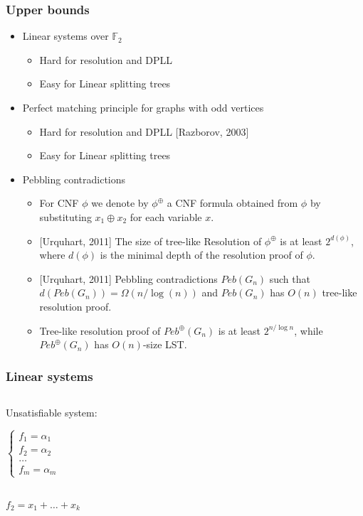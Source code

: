 \begin{frame}
    \frametitle{Upper bounds}

    \begin{itemize}
		\item Linear systems over $\mathbb{F}_2$
			\begin{itemize}
				\item Hard for resolution and DPLL
				\item Easy for Linear splitting trees
			\end{itemize}
        \pause
		\item Perfect matching principle for graphs with odd vertices
			\begin{itemize}
				\item Hard for resolution and DPLL [Razborov, 2003]
				\item Easy for Linear splitting trees
			\end{itemize}
        \pause
		\item Pebbling contradictions
			\begin{itemize}
				\item For CNF $\phi$ we denote by $\phi^{\oplus}$ a CNF formula
	            	obtained from $\phi$ by substituting $x_1\oplus x_2$ for each
	                variable $x$. 
				\item{} [Urquhart, 2011] The size of tree-like Resolution of
		            $\phi^{\oplus}$ is at least $2^{d(\phi)}$, where $d(\phi)$ is the
                    minimal depth of the resolution proof of $\phi$.
				\item{} [Urquhart, 2011] Pebbling contradictions $Peb(G_n)$ such that
		            $d(Peb(G_n)) = \Omega(n / \log(n))$ and $Peb(G_n)$ has $O(n)$
                    tree-like resolution proof. 
				\item Tree-like resolution proof of $Peb^\oplus(G_n)$ is at least
		            $2^{n / \log n}$, while $Peb^\oplus(G_n)$ has $O(n)$-size LST. 
			\end{itemize}
	\end{itemize}
\end{frame}




\begin{frame}
    \frametitle{Linear systems}

    \begin{columns}
		\begin{column}{1cm}
			Unsatisfiable system:

			$\left\{ \begin{aligned}
				f_1 = \alpha_1 \\
				f_2 = \alpha_2 \\
				\dots\\
				f_m = \alpha_m
			\end{aligned}\right.$
		\end{column}


		\begin{column}{9cm}
			
		\end{column}
	\end{columns}

	$f_2 = x_1 + \dots + x_k$
\end{frame}


